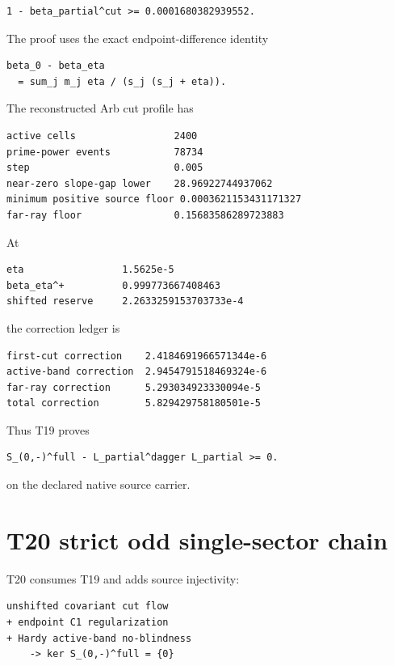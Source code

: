 \begin{verbatim}
1 - beta_partial^cut >= 0.0001680382939552.
\end{verbatim}

The proof uses the exact endpoint-difference identity

\begin{verbatim}
beta_0 - beta_eta
  = sum_j m_j eta / (s_j (s_j + eta)).
\end{verbatim}

The reconstructed Arb cut profile has

\begin{verbatim}
active cells                 2400
prime-power events           78734
step                         0.005
near-zero slope-gap lower    28.96922744937062
minimum positive source floor 0.0003621153431171327
far-ray floor                0.15683586289723883
\end{verbatim}

At

\begin{verbatim}
eta                 1.5625e-5
beta_eta^+          0.999773667408463
shifted reserve     2.2633259153703733e-4
\end{verbatim}

the correction ledger is

\begin{verbatim}
first-cut correction    2.4184691966571344e-6
active-band correction  2.9454791518469324e-6
far-ray correction      5.293034923330094e-5
total correction        5.829429758180501e-5
\end{verbatim}

Thus T19 proves

\begin{verbatim}
S_(0,-)^full - L_partial^dagger L_partial >= 0.
\end{verbatim}

on the declared native source carrier.

\hypertarget{t20-strict-odd-single-sector-chain}{%
\section{T20 strict odd single-sector chain}\label{t20-strict-odd-single-sector-chain}}

T20 consumes T19 and adds source injectivity:

\begin{verbatim}
unshifted covariant cut flow
+ endpoint C1 regularization
+ Hardy active-band no-blindness
    -> ker S_(0,-)^full = {0}
\end{verbatim}

